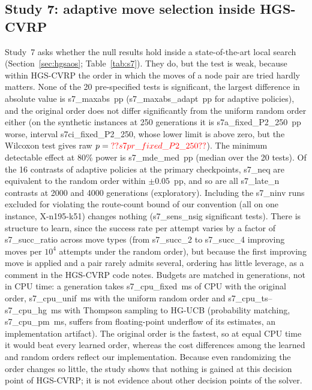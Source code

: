 \subsection{Study 7: adaptive move selection inside HGS-CVRP}\label{sec:s7}
Study~7 asks whether the null results hold inside a state-of-the-art local search (Section~\ref{sec:hgsaos}; Table~\ref{tab:s7}). They do, but the test is weak, because within HGS-CVRP the order in which the moves of a node pair are tried hardly matters. None of the 20 pre-specified tests is significant, the largest difference in absolute value is \num{s7_maxabs}~pp (\num{s7_maxabs_adapt}~pp for adaptive policies), and the original order does not differ significantly from the uniform random order either (on the synthetic instances at 250 generations it is \num{s7a_fixed_P2_250}~pp worse, interval \num{s7ci_fixed_P2_250}, whose lower limit is above zero, but the Wilcoxon test gives raw $p=\num{s7pr_fixed_P2_250}$). The minimum detectable effect at 80\% power is \num{s7_mde_med}~pp (median over the 20 tests). Of the 16 contrasts of adaptive policies at the primary checkpoints, \num{s7_neq} are equivalent to the random order within $\pm0.05$~pp, and so are all \num{s7_late_n} contrasts at 2000 and 4000 generations (exploratory). Including the \num{s7_ninv} runs excluded for violating the route-count bound of our convention (all on one instance, X-n195-k51) changes nothing (\num{s7_sens_nsig} significant tests). There is structure to learn, since the success rate per attempt varies by a factor of \num{s7_succ_ratio} across move types (from \num{s7_succ_2} to \num{s7_succ_4} improving moves per $10^4$ attempts under the random order), but because the first improving move is applied and a pair rarely admits several, ordering has little leverage, as a comment in the HGS-CVRP code notes. Budgets are matched in generations, not in CPU time: a generation takes \num{s7_cpu_fixed}~ms of CPU with the original order, \num{s7_cpu_unif}~ms with the uniform random order and \num{s7_cpu_ts}--\num{s7_cpu_hg}~ms with Thompson sampling to HG-UCB (probability matching, \num{s7_cpu_pm}~ms, suffers from floating-point underflow of its estimates, an implementation artifact). The original order is the fastest, so at equal CPU time it would beat every learned order, whereas the cost differences among the learned and random orders reflect our implementation. Because even randomizing the order changes so little, the study shows that nothing is gained at this decision point of HGS-CVRP; it is not evidence about other decision points of the solver.

